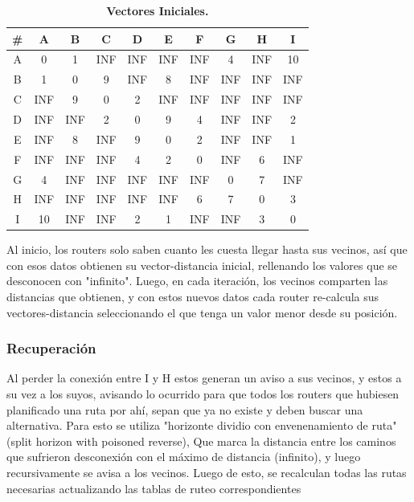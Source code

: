 \documentclass[12pt]{article}
\begin{document}
\begin{table}[H]
\centering
\begin{tabular}{| c | c | c | c | c | c | c | c | c | c |}
\hline
\#  & A & B & C & D & E & F & G & H & I\\
\hline
A & 0 & 1 & INF & INF & INF & INF & 4 & INF & 10\\
\hline
B & 1 & 0 & 9 & INF & 8 & INF & INF & INF & INF\\
\hline
C & INF & 9 & 0 & 2 & INF & INF & INF & INF & INF\\
\hline
D & INF & INF & 2 & 0 & 9 & 4 & INF & INF & 2\\
\hline
E & INF & 8 & INF & 9 & 0 & 2 & INF & INF & 1\\
\hline
F & INF & INF & INF & 4 & 2 & 0 & INF & 6 & INF\\
\hline
G & 4 & INF & INF & INF & INF & INF & 0 & 7 & INF\\
\hline
H & INF & INF & INF & INF & INF & 6 & 7 & 0 & 3\\
\hline
I & 10 & INF & INF & 2 & 1 & INF & INF & 3 & 0\\
\hline
\end{tabular}
\caption{\small \textbf{Vectores Iniciales.}}
\end{table}

	Al inicio, los routers solo saben cuanto les cuesta llegar hasta sus vecinos, así que con esos datos obtienen su vector-distancia inicial, rellenando los valores que se desconocen con "infinito". Luego, en cada iteración, los vecinos comparten las distancias que obtienen, y con estos nuevos datos cada router re-calcula sus vectores-distancia seleccionando el que tenga un valor menor desde su posición. 








\subsubsection{Recuperación}

Al perder la conexión entre I y H estos generan un aviso a sus vecinos, y estos a su vez a los suyos, avisando lo ocurrido para que todos los routers que hubiesen planificado una ruta por ahí, sepan que ya no existe y deben buscar una alternativa. Para esto se utiliza "horizonte dividio con envenenamiento de ruta"(split horizon with poisoned reverse), Que marca la distancia entre los caminos que sufrieron desconexión con el máximo de distancia (infinito), y luego recursivamente se avisa a los vecinos. Luego de esto, se recalculan todas las rutas necesarias actualizando las tablas de ruteo correspondientes\\



 
\end{document}
